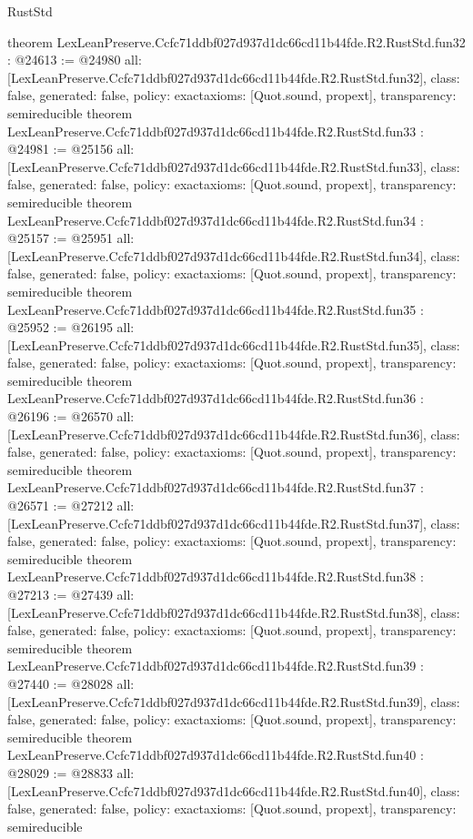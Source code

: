 \begin{lexlean}{RustStd}
\begin{coremodule}
{}
theorem LexLeanPreserve.Ccfc71ddbf027d937d1dc66cd11b44fde.R2.RustStd.fun32 : @24613 := @24980 {
  all: [LexLeanPreserve.Ccfc71ddbf027d937d1dc66cd11b44fde.R2.RustStd.fun32],
  class: false,
  generated: false,
  policy: exact{axioms: [Quot.sound, propext]},
  transparency: semireducible
}
theorem LexLeanPreserve.Ccfc71ddbf027d937d1dc66cd11b44fde.R2.RustStd.fun33 : @24981 := @25156 {
  all: [LexLeanPreserve.Ccfc71ddbf027d937d1dc66cd11b44fde.R2.RustStd.fun33],
  class: false,
  generated: false,
  policy: exact{axioms: [Quot.sound, propext]},
  transparency: semireducible
}
theorem LexLeanPreserve.Ccfc71ddbf027d937d1dc66cd11b44fde.R2.RustStd.fun34 : @25157 := @25951 {
  all: [LexLeanPreserve.Ccfc71ddbf027d937d1dc66cd11b44fde.R2.RustStd.fun34],
  class: false,
  generated: false,
  policy: exact{axioms: [Quot.sound, propext]},
  transparency: semireducible
}
theorem LexLeanPreserve.Ccfc71ddbf027d937d1dc66cd11b44fde.R2.RustStd.fun35 : @25952 := @26195 {
  all: [LexLeanPreserve.Ccfc71ddbf027d937d1dc66cd11b44fde.R2.RustStd.fun35],
  class: false,
  generated: false,
  policy: exact{axioms: [Quot.sound, propext]},
  transparency: semireducible
}
theorem LexLeanPreserve.Ccfc71ddbf027d937d1dc66cd11b44fde.R2.RustStd.fun36 : @26196 := @26570 {
  all: [LexLeanPreserve.Ccfc71ddbf027d937d1dc66cd11b44fde.R2.RustStd.fun36],
  class: false,
  generated: false,
  policy: exact{axioms: [Quot.sound, propext]},
  transparency: semireducible
}
theorem LexLeanPreserve.Ccfc71ddbf027d937d1dc66cd11b44fde.R2.RustStd.fun37 : @26571 := @27212 {
  all: [LexLeanPreserve.Ccfc71ddbf027d937d1dc66cd11b44fde.R2.RustStd.fun37],
  class: false,
  generated: false,
  policy: exact{axioms: [Quot.sound, propext]},
  transparency: semireducible
}
theorem LexLeanPreserve.Ccfc71ddbf027d937d1dc66cd11b44fde.R2.RustStd.fun38 : @27213 := @27439 {
  all: [LexLeanPreserve.Ccfc71ddbf027d937d1dc66cd11b44fde.R2.RustStd.fun38],
  class: false,
  generated: false,
  policy: exact{axioms: [Quot.sound, propext]},
  transparency: semireducible
}
theorem LexLeanPreserve.Ccfc71ddbf027d937d1dc66cd11b44fde.R2.RustStd.fun39 : @27440 := @28028 {
  all: [LexLeanPreserve.Ccfc71ddbf027d937d1dc66cd11b44fde.R2.RustStd.fun39],
  class: false,
  generated: false,
  policy: exact{axioms: [Quot.sound, propext]},
  transparency: semireducible
}
theorem LexLeanPreserve.Ccfc71ddbf027d937d1dc66cd11b44fde.R2.RustStd.fun40 : @28029 := @28833 {
  all: [LexLeanPreserve.Ccfc71ddbf027d937d1dc66cd11b44fde.R2.RustStd.fun40],
  class: false,
  generated: false,
  policy: exact{axioms: [Quot.sound, propext]},
  transparency: semireducible
}
\end{coremodule}
\end{lexlean}
